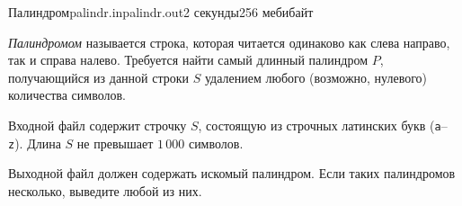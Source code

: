 \begin{problem}{Палиндром}{palindr.in}{palindr.out}{2 секунды}{256 мебибайт}

\emph{Палиндромом} называется строка, которая читается одинаково как слева направо,
так и справа налево. Требуется найти самый длинный палиндром $P$, получающийся из
данной строки $S$ удалением любого (возможно, нулевого) количества символов.

\InputFile

Входной файл содержит строчку $S$, состоящую из строчных латинских букв (\texttt{a}--\texttt{z}).
Длина $S$ не превышает $1\,000$ символов.

\OutputFile

Выходной файл должен содержать искомый палиндром. Если таких палиндромов несколько,
выведите любой из них.

\Examples

\begin{example}
%
%
\end{example}

\end{problem}
